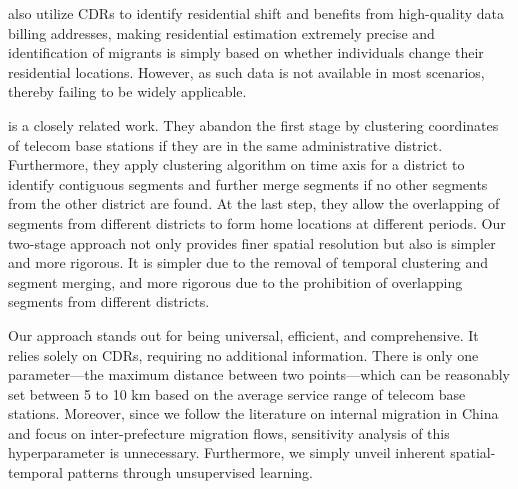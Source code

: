 \cite{buchel2020calling} also utilize CDRs to identify residential shift and benefits from high-quality data billing addresses, making residential estimation extremely precise and identification of migrants is simply based on whether individuals change their residential locations. However, as such data is not available in most scenarios, thereby failing to be widely applicable.

\cite{chi2020general} is a closely related work. They abandon the first stage by clustering coordinates of telecom base stations if they are in the same administrative district. Furthermore, they apply clustering algorithm on time axis for a district to identify contiguous segments and further merge segments if no other segments from the other district are found. At the last step, they allow the overlapping of segments from different districts to form home locations at different periods. Our two-stage approach not only provides finer spatial resolution but also is simpler and more rigorous. It is simpler due to the removal of temporal clustering and segment merging, and more rigorous due to the prohibition of overlapping segments from different districts.

Our approach stands out for being universal, efficient, and comprehensive.
It relies solely on CDRs, requiring no additional information.
There is only one parameter—the maximum distance between two points—which can be reasonably set between 5 to 10 km based on the average service range of telecom base stations.
Moreover, since we follow the literature on internal migration in China and focus on inter-prefecture migration flows, sensitivity analysis of this hyperparameter is unnecessary.
Furthermore, we simply unveil inherent spatial-temporal patterns through unsupervised learning.
